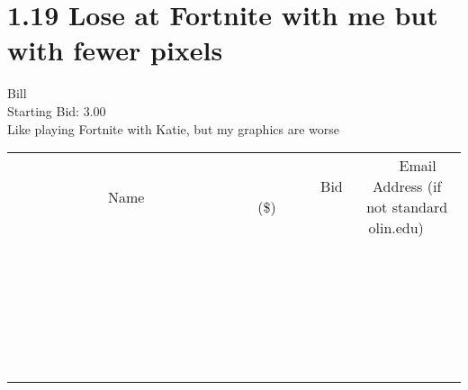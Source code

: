 \documentclass[11pt]{article}
\begin{document}
					\section*{1.19 Lose at Fortnite with me but with fewer pixels}
					Bill \\
					Starting Bid: 3.00 \\
					Like playing Fortnite with Katie, but my graphics are worse \\
					[6ex]
					\begin{tabular}{c c c}
						~~~~~~~~~~~~~Name~~~~~~~~~~~~~ & ~~~~~~~~~Bid (\$)~~~~~~~~~ & ~~~Email Address (if not standard olin.edu)~~~ \\
				
 & & \\
\hline
 & & \\
\hline
 & & \\
\hline
 & & \\
\hline
 & & \\
\hline
 & & \\
\hline
 & & \\
\hline
 & & \\
\hline
 & & \\
\hline
 & & \\
\hline
 & & \\
\hline
 & & \\
\hline
 & & \\
\hline
 & & \\
\hline
 & & \\
\hline
 & & \\
\hline
 & & \\
\hline
 & & \\
\hline
 & & \\
\hline
 & & \\
\hline
 & & \\
\hline
 & & \\
\hline
 & & \\
\hline
 & & \\
\hline
 & & \\
\hline
 & & \\
\hline
					\end{tabular}
					\clearpage
				
\end{document}
